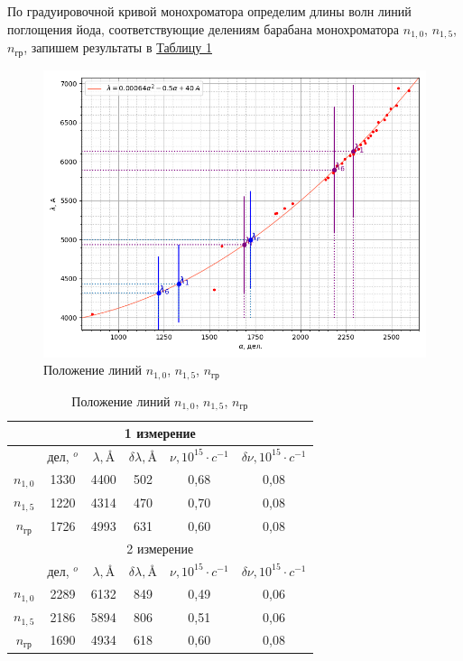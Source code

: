 \documentclass{article}
\begin{document}
По градуировочной кривой монохроматора определим длины волн линий поглощения йода, соответствующие делениям барабана монохроматора $n_{1,0}$, $n_{1,5}$, $n_{гр}$, запишем результаты в \hyperref[tab:2]{Таблицу \ref*{tab:2}}

\begin{figure}[h!]
    \centering
    \includegraphics[scale = 0.75]{Figure_3.png}
     \caption{Положение линий $n_{1,0}$, $n_{1,5}$, $n_{гр}$}
    \label{fig:n0,5}
\end{figure}
\begin{table}[h!]
    \begin{center}
        
    
    \begin{tabular}{|c|c|c|c|c|c|} \hline 
 \multicolumn{6}{|c|}{1 измерение}\\ \hline 
         &  дел, $^o$&  $\lambda, \text{\AA}$&  $\delta \lambda, \text{\AA}$  & $\nu, 10^{15}\cdot c^{-1}$& $\delta\nu, 10^{15}\cdot c^{-1}$\\ \hline 
         $n_{1,0}$&  1330&  4400&  502 & 0,68& 0,08\\ \hline 
         $n_{1,5}$&  1220&  4314&  470 & 0,70& 0,08\\ \hline 
          $n_{гр}$&  1726&  4993&  631 & 0,60& 0,08\\ \hline 
         \multicolumn{6}{|c|}{2 измерение}\\ \hline 
         &  дел, $^o$&  $\lambda, \text{\AA}$&  $\delta \lambda, \text{\AA}$  & $\nu, 10^{15}\cdot c^{-1}$& $\delta\nu, 10^{15}\cdot c^{-1}$\\ \hline 
         $n_{1,0}$&  2289&  6132&  849 & 0,49& 0,06\\ \hline 
         $n_{1,5}$&  2186&  5894&  806 & 0,51& 0,06\\ \hline 
          $n_{гр}$&  1690&  4934&  618 & 0,60& 0,08\\ \hline
    \end{tabular}
    \caption{Положение линий $n_{1,0}$, $n_{1,5}$, $n_{гр}$}
    \label{tab:2}
    \end{center}
\end{table}
\end{document}
